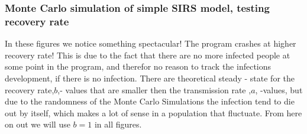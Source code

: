 \subsubsection{Monte Carlo simulation of simple SIRS model, testing recovery rate}
	In these figures we notice something spectacular! The program crashes at higher recovery rate! This is due to the fact that there are no more infected people at some point in the program, and therefor no reason to track the infections development, if there is no infection. There are theoretical steady - state for the recovery rate,$b$,- values that are smaller then the transmission rate ,$a$, -values, but due to the randomness of the Monte Carlo Simulations the infection tend to die out by itself, which makes a lot of sense in a population that fluctuate. From here on out we will use $b=1$ in all figures. 
	 
